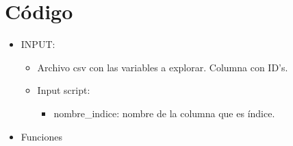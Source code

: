 \section{Código}
\begin{itemize}
    \item INPUT: 
    \begin{itemize}
        \item Archivo csv con las variables a explorar. Columna con ID's.
        \item Input script:
        \begin{itemize}
            \item nombre\_indice: nombre de la columna que es índice.
        \end{itemize}
    \end{itemize}
    \item Funciones
    
    
    
    
    
\end{itemize}